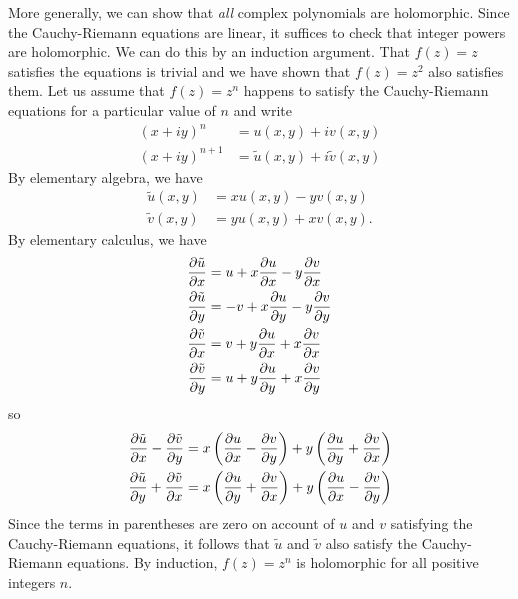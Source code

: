 \documentclass[12pt]{article}
\begin{document}
More generally, we can show that \emph{all} complex
polynomials are holomorphic.  Since the Cauchy-Riemann
equations are linear, it suffices to check that integer 
powers are holomorphic.  We can do this by an induction
argument.  That $f(z) = z$ satisfies the equations is
trivial and we have shown that $f(z) = z^2$ also
satisfies them.  Let us assume that $f(z) = z^n$ 
happens to satisfy the Cauchy-Riemann equations for a 
particular value of $n$ and write
\begin{align*}
 (x + iy)^n &= u(x,y) + iv(x,y) \\
 (x + iy)^{n+1} &= {\tilde u} (x,y) + i {\tilde v} (x,y)
\end{align*}
By elementary algebra, we have
\begin{align*}
 {\tilde u} (x,y) &= x u(x,y) - y v(x,y) \\
 {\tilde v} (x,y) &= y u(x,y) + x v(x,y) .
\end{align*}
By elementary calculus, we have
\begin{align*}
 {\partial \tilde u \over \partial x} &=
   u + x {\partial u \over \partial x} - 
       y {\partial v \over \partial x} \\
 {\partial \tilde u \over \partial y} &=
 - v + x {\partial u \over \partial y} - 
       y {\partial v \over \partial y} \\
 {\partial \tilde v \over \partial x} &=
   v + y {\partial u \over \partial x} + 
       x {\partial v \over \partial x} \\
 {\partial \tilde v \over \partial y} &=
   u + y {\partial u \over \partial y} + 
       x {\partial v \over \partial y} 
\end{align*}
so
\begin{align*}
 {\partial \tilde u \over \partial x} - 
   {\partial \tilde v \over \partial y} &=
 x \left( {\partial u \over \partial x} - 
     {\partial v \over \partial y} \right) + 
 y \left( {\partial u \over \partial y} + 
     {\partial v \over \partial x} \right) \\
 {\partial \tilde u \over \partial y} + 
   {\partial \tilde v \over \partial x} &=
 x \left( {\partial u \over \partial y} + 
     {\partial v \over \partial x} \right) +
 y \left( {\partial u \over \partial x} - 
     {\partial v \over \partial y} \right)  
\end{align*}
Since the terms in parentheses are zero on account of
$u$ and $v$ satisfying the Cauchy-Riemann equations,
it follows that ${\tilde u}$ and ${\tilde v}$ also
satisfy the Cauchy-Riemann equations.  By induction,
$f(z) = z^n$ is holomorphic for all positive integers $n$.
\end{document}
